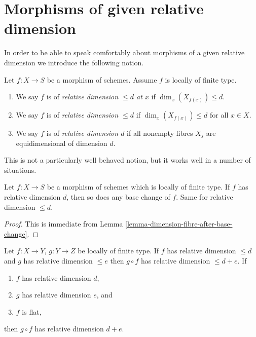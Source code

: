 \section{Morphisms of given relative dimension}
\label{section-relative-dimension}

\noindent
In order to be able to speak comfortably about morphisms of a
given relative dimension we introduce the following notion.

\begin{definition}
\label{definition-relative-dimension-d}
Let $f : X \to S$ be a morphism of schemes.
Assume $f$ is locally of finite type.
\begin{enumerate}
\item We say $f$ is of {\it relative dimension $\leq d$ at $x$} if
$\dim_x(X_{f(x)}) \leq d$.
\item We say $f$ is of {\it relative dimension $\leq d$} if
$\dim_x(X_{f(x)}) \leq d$ for all $x \in X$.
\item We say $f$ is of {\it relative dimension $d$} if
all nonempty fibres $X_s$ are equidimensional of dimension $d$.
\end{enumerate}
\end{definition}

\noindent
This is not a particularly well behaved notion, but it works well
in a number of situations.

\begin{lemma}
\label{lemma-base-change-relative-dimension-d}
Let $f : X \to S$ be a morphism of schemes which is locally of finite type.
If $f$ has relative dimension $d$, then so does any base change of $f$.
Same for relative dimension $\leq d$.
\end{lemma}

\begin{proof}
This is immediate from
Lemma \ref{lemma-dimension-fibre-after-base-change}.
\end{proof}

\begin{lemma}
\label{lemma-composition-relative-dimension-d}
Let $f : X \to Y$, $g : Y \to Z$ be locally of finite type.
If $f$ has relative dimension $\leq d$ and $g$ has relative dimension $\leq e$
then $g \circ f$ has relative dimension $\leq d + e$.
If
\begin{enumerate}
\item $f$ has relative dimension $d$,
\item $g$ has relative dimension $e$, and
\item $f$ is flat,
\end{enumerate}
then $g \circ f$ has relative dimension $d + e$.
\end{lemma}

